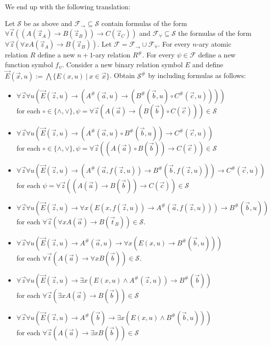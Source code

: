 \documentclass[a4paper,UKenglish,cleveref, autoref, thm-restate]{lipics-v2021}
\begin{document}
We end up with the following translation:

\begin{theorem}\label{fullFOtranslation}
	Let $\mathcal S$ be as above and $\mathcal F_\to\subseteq\mathcal S$ contain formulas of the form $\forall \vec t((A(\vec z_A)\to B(\vec z_B))\to C(\vec z_C))$ and $\mathcal F_\forall\subseteq\mathcal S$ the formulas of the form $\forall \vec z(\forall xA(\vec z_A)\to B(\vec z_B))$. Let $\mathcal F = \mathcal F_\to\cup\mathcal F_\forall$. For every $n$-ary atomic relation $R$ define a new $n+1$-ary relation $R^\#$. For every $\psi\in\mathcal F$ define a new function symbol $f_\psi$. Consider a new binary relation symbol $E$ and define $\vec E(\vec x, u) := \bigwedge\{E(x, u)\:|\:x\in\vec x\}$. Obtain $\mathcal S^\#$ by including formulas as follows:
	\begin{itemize}
		\item $\forall \vec z\forall u(\vec E(\vec z, u)\to (A^\#(\vec a, u)\to (B^\#(\vec b, u)\circ C^\#(\vec c, u))))$\\for each $\circ\in\{\wedge, \vee\}, \psi = \forall \vec z(A(\vec a)\to (B(\vec b)\circ C(\vec c)))\in\mathcal S$
		\item $\forall \vec z\forall u(\vec E(\vec z, u)\to (A^\#(\vec a, u)\circ B^\#(\vec b, u))\to C^\#(\vec c, u))$\\for each $\circ\in\{\wedge, \vee\}, \psi = \forall \vec z((A(\vec a)\circ B(\vec b))\to C(\vec c))\in\mathcal S$
		\item $\forall \vec z\forall u(\vec E(\vec z, u)\to(A^\#(\vec a, f(\vec z, u))\to B^\#(\vec b, f(\vec z, u)))\to C^\#(\vec c, u))$ for each $\psi = \forall \vec z((A(\vec a)\to B(\vec b))\to C(\vec c))\in\mathcal S$
		\item  $\forall \vec z\forall u(\vec E(\vec z, u)\to \forall x(E(x, f(\vec z, u))\to A^\#(\vec a, f(\vec z, u)))\to B^\#(\vec b, u))$\\for each $\forall \vec z(\forall xA(\vec a)\to B(\vec t_B))\in\mathcal S$.
		\item $\forall \vec z\forall u(\vec E(\vec z, u)\to A^\#(\vec a, u)\to \forall x(E(x, u)\to B^\#(\vec b, u)))$\\for each $\forall \vec t(A(\vec a)\to \forall xB(\vec b))\in\mathcal S$.
		\item $\forall \vec z\forall u(\vec E(\vec z, u)\to \exists x(E(x, u)\wedge A^\#(\vec z, u))\to B^\#(\vec b))$\\for each $\forall \vec z(\exists xA(\vec a)\to B(\vec b))\in\mathcal S$
		\item $\forall \vec z\forall u(\vec E(\vec z, u)\to A^\#(\vec b)\to \exists x(E(x, u)\wedge B^\#(\vec b, u)))$\\for each $\forall \vec z(A(\vec a)\to \exists xB(\vec b))\in\mathcal S$

\end{itemize}
\end{theorem}
\end{document}
